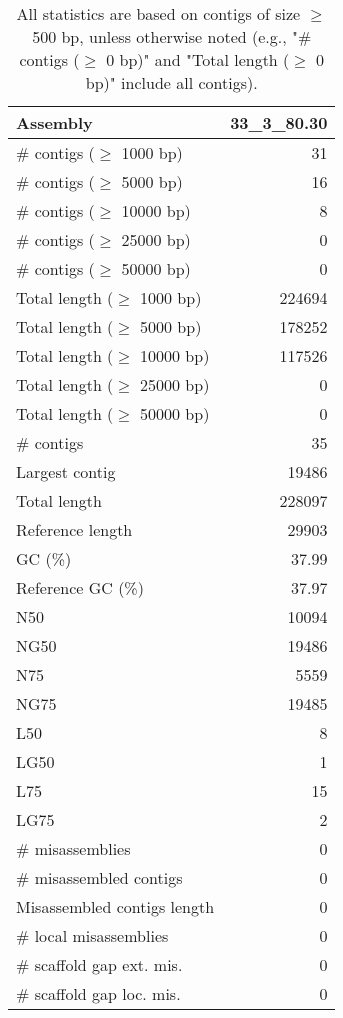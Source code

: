 \documentclass[12pt,a4paper]{article}
\begin{document}
\begin{table}[ht]
\begin{center}
\caption{All statistics are based on contigs of size $\geq$ 500 bp, unless otherwise noted (e.g., "\# contigs ($\geq$ 0 bp)" and "Total length ($\geq$ 0 bp)" include all contigs).}
\begin{tabular}{|l*{1}{|r}|}
\hline
Assembly & 33\_3\_80.30 \\ \hline
\# contigs ($\geq$ 1000 bp) & 31 \\ \hline
\# contigs ($\geq$ 5000 bp) & 16 \\ \hline
\# contigs ($\geq$ 10000 bp) & 8 \\ \hline
\# contigs ($\geq$ 25000 bp) & 0 \\ \hline
\# contigs ($\geq$ 50000 bp) & 0 \\ \hline
Total length ($\geq$ 1000 bp) & 224694 \\ \hline
Total length ($\geq$ 5000 bp) & 178252 \\ \hline
Total length ($\geq$ 10000 bp) & 117526 \\ \hline
Total length ($\geq$ 25000 bp) & 0 \\ \hline
Total length ($\geq$ 50000 bp) & 0 \\ \hline
\# contigs & 35 \\ \hline
Largest contig & 19486 \\ \hline
Total length & 228097 \\ \hline
Reference length & 29903 \\ \hline
GC (\%) & 37.99 \\ \hline
Reference GC (\%) & 37.97 \\ \hline
N50 & 10094 \\ \hline
NG50 & 19486 \\ \hline
N75 & 5559 \\ \hline
NG75 & 19485 \\ \hline
L50 & 8 \\ \hline
LG50 & 1 \\ \hline
L75 & 15 \\ \hline
LG75 & 2 \\ \hline
\# misassemblies & 0 \\ \hline
\# misassembled contigs & 0 \\ \hline
Misassembled contigs length & 0 \\ \hline
\# local misassemblies & 0 \\ \hline
\# scaffold gap ext. mis. & 0 \\ \hline
\# scaffold gap loc. mis. & 0 \\ \hline

\end{tabular}
\end{center}
\end{table}
\end{document}
